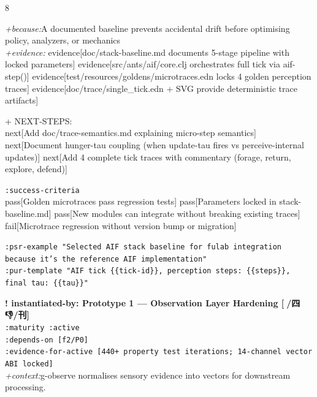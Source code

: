 \documentclass[landscape]{article}
\newcommand{\flexitag}[1]{\textcolor[gray]{0.35}{\textit{#1}}}
\newenvironment{devmapactive}{%
  \def\FrameCommand{\colorbox{devmapactivebg}}%
  \setlength{\fboxsep}{2pt}%
  \MakeFramed{\advance\hsize-\width \FrameRestore}%
}{\endMakeFramed}
\begin{document}
\begin{paracol}{8}
\begin{devmapactive}
  \flexitag{+because:}A documented baseline prevents accidental drift before optimising policy, analyzers, or mechanics\\
  \flexitag{+evidence:} evidence[doc/stack-baseline.md documents 5-stage pipeline with locked parameters] evidence[src/ants/aif/core.clj orchestrates full tick via aif-step()] evidence[test/resources/goldens/microtraces.edn locks 4 golden perception traces] evidence[doc/trace/single\_tick.edn + SVG provide deterministic trace artifacts]\\
\par
  + NEXT-STEPS:\\
    next[Add doc/trace-semantics.md explaining micro-step semantics] next[Document hunger-tau coupling (when update-tau fires vs perceive-internal updates)] next[Add 4 complete tick traces with commentary (forage, return, explore, defend)]\\
\par
  \texttt{:\allowbreak{}success-\allowbreak{}criteria}\\
    pass[Golden microtraces pass regression tests] pass[Parameters locked in stack-baseline.md] pass[New modules can integrate without breaking existing traces] fail[Microtrace regression without version bump or migration]\\
\par
  \texttt{:\allowbreak{}psr-\allowbreak{}example "Selected AIF stack baseline for fulab integration because it's the reference AIF implementation"}\\
  \texttt{:\allowbreak{}pur-\allowbreak{}template "AIF tick \{\{tick-\allowbreak{}id\}\},\allowbreak{} perception steps:\allowbreak{} \{\{steps\}\},\allowbreak{} final tau:\allowbreak{} \{\{tau\}\}"}\\
\par
\par
\end{devmapactive}
\begin{devmapactive}
\textbf{! instantiated-by: Prototype 1 — Observation Layer Hardening [🌝/四 👎/刊]}\\
  \texttt{:\allowbreak{}maturity :\allowbreak{}active}\\
  \texttt{:\allowbreak{}depends-\allowbreak{}on [f2/\allowbreak{}P0]}\\
  \texttt{:\allowbreak{}evidence-\allowbreak{}for-\allowbreak{}active [440+\allowbreak{} property test iterations;\allowbreak{} 14-\allowbreak{}channel vector ABI locked]}\\
  \flexitag{+context:}g-observe normalises sensory evidence into vectors for downstream processing.\\

\end{devmapactive}
\end{paracol}
\end{document}
